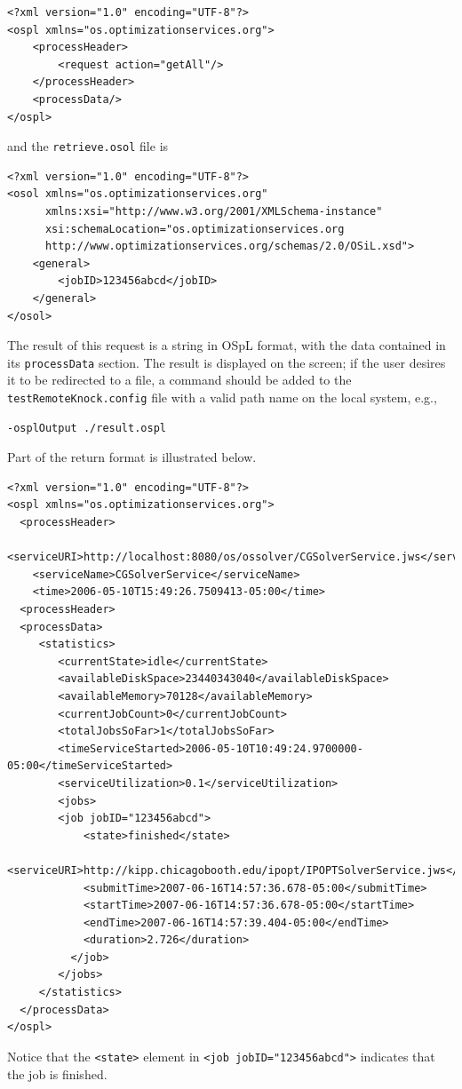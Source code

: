 \documentclass[11pt]{article}
\renewcommand{\_}{{\char"5F}}
\renewcommand{\{}{{\char"7B}}
\renewcommand{\}}{{\char"7D}}
\renewcommand{\^}{{\char"0D}}
\renewcommand{\'}{{\char"0D}}
\begin{document}
\begin{enumerate}[Step 1:]
\begin{verbatim}
<?xml version="1.0" encoding="UTF-8"?>
<ospl xmlns="os.optimizationservices.org">
    <processHeader>
        <request action="getAll"/>
    </processHeader>
    <processData/>
</ospl>
\end{verbatim}
and the {\tt retrieve.osol} file is
\begin{verbatim}
<?xml version="1.0" encoding="UTF-8"?>
<osol xmlns="os.optimizationservices.org"
      xmlns:xsi="http://www.w3.org/2001/XMLSchema-instance"
      xsi:schemaLocation="os.optimizationservices.org
      http://www.optimizationservices.org/schemas/2.0/OSiL.xsd">
    <general>
        <jobID>123456abcd</jobID>
    </general>
</osol>
\end{verbatim}

The result of this request is a string in OSpL format, with the data contained in its
{\tt processData} section.  The result is displayed on the screen; if the user desires it
to be redirected to a file, a command should be added to the {\tt testRemoteKnock.config}
file with a valid path name on the local system, e.g.,

\begin{verbatim}
-osplOutput ./result.ospl
\end{verbatim}

Part of the return format is illustrated below.


\begin{verbatim}
<?xml version="1.0" encoding="UTF-8"?>
<ospl xmlns="os.optimizationservices.org">
  <processHeader>
    <serviceURI>http://localhost:8080/os/ossolver/CGSolverService.jws</serviceURI>
    <serviceName>CGSolverService</serviceName>
    <time>2006-05-10T15:49:26.7509413-05:00</time>
  <processHeader>
  <processData>
     <statistics>
        <currentState>idle</currentState>
        <availableDiskSpace>23440343040</availableDiskSpace>
        <availableMemory>70128</availableMemory>
        <currentJobCount>0</currentJobCount>
        <totalJobsSoFar>1</totalJobsSoFar>
        <timeServiceStarted>2006-05-10T10:49:24.9700000-05:00</timeServiceStarted>
        <serviceUtilization>0.1</serviceUtilization>
        <jobs>
        <job jobID="123456abcd">
            <state>finished</state>
            <serviceURI>http://kipp.chicagobooth.edu/ipopt/IPOPTSolverService.jws</serviceURI>
            <submitTime>2007-06-16T14:57:36.678-05:00</submitTime>
            <startTime>2007-06-16T14:57:36.678-05:00</startTime>
            <endTime>2007-06-16T14:57:39.404-05:00</endTime>
            <duration>2.726</duration>
          </job>
        </jobs>
     </statistics>
  </processData>
</ospl>
\end{verbatim}
Notice that the {\tt <state>} element in {\tt <job jobID="123456abcd">} indicates that the job is finished.


\end{enumerate}
\end{document}
